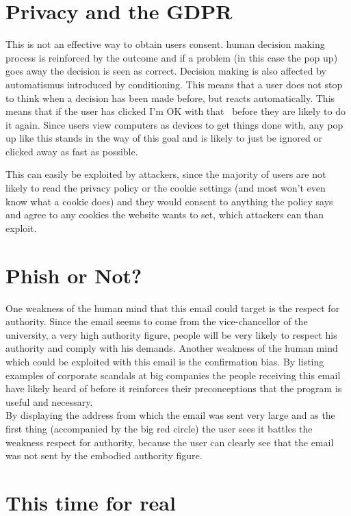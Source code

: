 \documentclass{article}
\begin{document}
\section{Privacy and the GDPR}
This is not an effective way to obtain users consent. human decision making process is reinforced by the outcome and if a problem (in this case the pop up) goes away the decision is seen as correct. Decision making is also affected by automatismus introduced by conditioning. This means that a user does not stop to think when a decision has been made before, but reacts automatically. This means that if the user has clicked \glqq I'm OK with that\grqq ~ before they are likely to do it again. Since users view computers as devices to get things done with, any pop up like this stands in the way of this goal and is likely to just be ignored or clicked away as fast as possible.\\ \newline

\noindent This can easily be exploited by attackers, since the majority of users are not likely to read the privacy policy or the cookie settings (and most won't even know what a cookie does) and they would consent to anything the policy says and agree to any cookies the website wants to set, which attackers can than exploit.

\section{Phish or Not?}
One weakness of the human mind that this email could target is the respect for authority. Since the email seems to come from the vice-chancellor of the university, a very high authority figure, people will be very likely to respect his authority and comply with his demands. Another weakness of the human mind which could be exploited with this email is the confirmation bias. By listing examples of corporate scandals at big companies the people receiving this email have likely heard of before it reinforces their preconceptions that the program is useful and necessary.\\ \newline
\noindent By displaying the address from which the email was sent very large and as the first thing (accompanied by the big red circle) the user sees it battles the weakness respect for authority, because the user can clearly see that the email was not sent by the embodied authority figure.


\section{This time for real}
\end{document}
